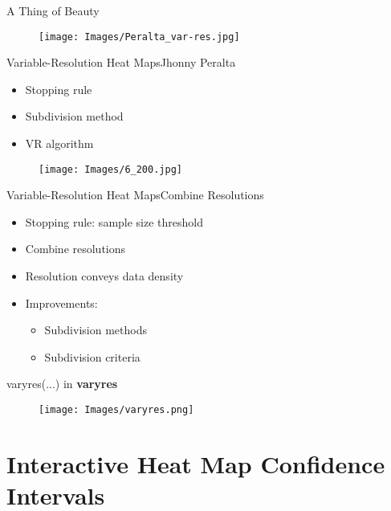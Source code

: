 \documentclass{beamer}
\begin{document}
\begin{frame}{A Thing of Beauty}{}
  \begin{figure}[H]
	\centering
	\texttt{[image: Images/Peralta\_var-res.jpg]}
	\label{fig:interp}
  \end{figure}
\end{frame}

\begin{frame}{Variable-Resolution Heat Maps}{Jhonny Peralta}
\begin{itemize}
\item Stopping rule
\item Subdivision method
\item VR algorithm
\end{itemize}
  \begin{figure}[H]
	\centering
	\texttt{[image: Images/6\_200.jpg]}
	\end{figure}
\end{frame}

\begin{frame}{Variable-Resolution Heat Maps}{Combine Resolutions}
\begin{itemize}
\addtolength{\itemsep}{0.5\baselineskip}
\item Stopping rule: sample size threshold
\item Combine resolutions
\item Resolution conveys data density
\item Improvements:
  \begin{itemize}
  \addtolength{\itemsep}{0.5\baselineskip}
  \item Subdivision methods
  \item Subdivision criteria
  \end{itemize}
\end{itemize}
\end{frame}

\begin{frame}{varyres(...) in {\bf varyres}}
  \begin{figure}[H]
	\centering
	\texttt{[image: Images/varyres.png]}
	\end{figure}
	\end{frame}

\section{Interactive Heat Map Confidence Intervals}
\end{document}

